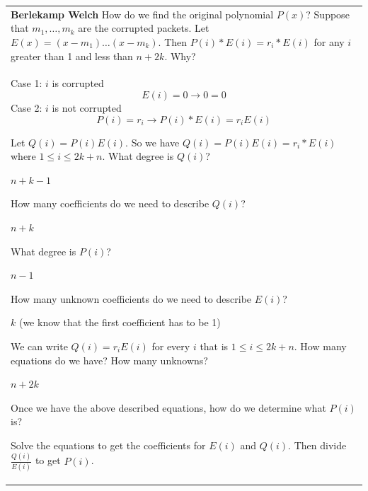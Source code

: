 {\tabulinesep=1mm
\begin{tabu}{|p{16cm} |}
\hline

\textbf{Berlekamp Welch} \newline
How do we find the original polynomial $P(x)$? Suppose that $m_1, \dotsc, m_k$ are the corrupted packets. Let $E(x) = (x - m_1) \dotsc (x - m_k)$. Then $P(i) * E(i) = r_i * E(i)$ for any $i$ greater than 1 and less than $n + 2k$. Why? \\
\begin{solution}[1 cm]
	Case 1: $i$ is corrupted
\[E(i) = 0 \rightarrow 0 = 0\]
			Case 2: $i$ is not corrupted
				\[P(i) = r_i \rightarrow P(i) * E(i) = r_i E(i)\]
\end{solution}

Let $Q(i) = P(i) E(i)$. 
So we have $Q(i)= P(i) E(i) = r_i * E(i)$ where $1 \leq i \leq 2k + n$. 
What degree is $Q(i)$? 
\begin{solution}[.5 cm]
$n + k - 1$
\end{solution}

How many coefficients do we need to describe $Q(i)$? 
\begin{solution}[.5 cm]
$n + k$
\end{solution}

What degree is $P(i)$? 
\begin{solution}[.5 cm]
$n - 1$
\end{solution}

How many unknown coefficients do we need to describe $E(i)$? 
\begin{solution}[.5 cm]
$k$ (we know that the first coefficient has to be 1)
\end{solution}

We can write $Q(i) = r_i E(i)$ for every $ i$ that is $1 \leq i \leq 2k + n$. \newline
How many equations do we have? How many unknowns? 
\begin{solution}[.5 cm]
$n + 2k$
\end{solution}

Once we have the above described equations, how do we determine what 
$P(i)$ is?
\begin{solution}[2 cm]
Solve the equations to get the coefficients for $E(i)$ and $Q(i)$. 
Then divide $\frac{Q(i)}{E(i)}$ to get $P(i)$.
\end{solution}
\\
\hline
\end{tabu}
}
